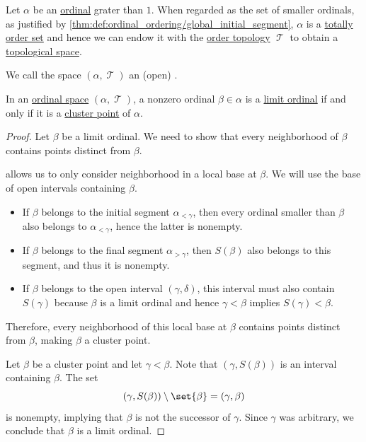 \begin{definition}\label{def:ordinal_space}
  Let \( \alpha \) be an \hyperref[def:ordinal]{ordinal} grater than \( 1 \). When regarded as the set of smaller ordinals, as justified by \cref{thm:def:ordinal_ordering/global_initial_segment}, \( \alpha \) is a \hyperref[def:totally_ordered_set]{totally order set} and hence we can endow it with the \hyperref[def:order_topology]{order topology} \( \mscrT \) to obtain a \hyperref[def:topological_space]{topological space}.

  We call the space \( (\alpha, \mscrT) \) an (open) .
\end{definition}

\begin{proposition}\label{thm:limit_ordinal_order_topology}
  In an \hyperref[def:ordinal_space]{ordinal space} \( (\alpha, \mscrT) \), a nonzero ordinal \( \beta \in \alpha \) is a \hyperref[def:successor_and_limit_ordinal]{limit ordinal} if and only if it is a \hyperref[def:set_cluster_point]{cluster point} of \( \alpha \).
\end{proposition}
\begin{proof}
  \SufficiencySubProof Let \( \beta \) be a limit ordinal. We need to show that every neighborhood of \( \beta \) contains points distinct from \( \beta \).

   allows us to only consider neighborhood in a local base at \( \beta \). We will use the base of open intervals containing \( \beta \).
  \begin{itemize}
    \item If \( \beta \) belongs to the initial segment \( \alpha_{<\gamma} \), then every ordinal smaller than \( \beta \) also belongs to \( \alpha_{<\gamma} \), hence the latter is nonempty.

    \item If \( \beta \) belongs to the final segment \( \alpha_{>\gamma} \), then \( S(\beta) \) also belongs to this segment, and thus it is nonempty.

    \item If \( \beta \) belongs to the open interval \( (\gamma, \delta) \), this interval must also contain \( S(\gamma) \) because \( \beta \) is a limit ordinal and hence \( \gamma < \beta \) implies \( S(\gamma) < \beta \).
  \end{itemize}

  Therefore, every neighborhood of this local base at \( \beta \) contains points distinct from \( \beta \), making \( \beta \) a cluster point.

  \NecessitySubProof Let \( \beta \) be a cluster point and let \( \gamma < \beta \). Note that \( (\gamma, S(\beta)) \) is an interval containing \( \beta \). The set
  \begin{equation*}
    (\gamma, S(\beta)) \setminus \set{ \beta }
    =
    (\gamma, \beta)
  \end{equation*}
  is nonempty, implying that \( \beta \) is not the successor of \( \gamma \). Since \( \gamma \) was arbitrary, we conclude that \( \beta \) is a limit ordinal.
\end{proof}
